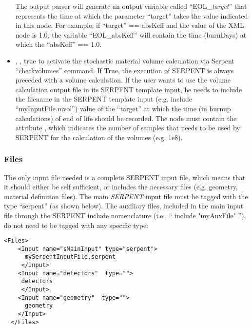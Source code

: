 \begin{itemize}
                                                              \nb  The output parser will generate an output variable called ``EOL\_\textit{target}'' that represents the time at which the 
                                                              parameter ``target'' takes the value indicated in this node. For example,  if ``target'' == absKeff and the value of the XML node is 1.0, 
                                                              the variable ``EOL\_absKeff'' will contain the time (burnDays) at which the ``absKeff'' == 1.0.
   \item {}, ,  true to activate the stochastic material volume calculation via Serpent ``checkvolumes'' command. If True, the execution of 
                                                             SERPENT is always preceded with a volume calculation. If the user wants to use the volume calculation output file in its SERPENT template input, he needs to include 
                                                             the filename in the SERPENT template input (e.g. include ``myInputFile.mvol'')  value of the ``target'' at which the time (in burnup calculations) of end of life should be recorded.
                                                             The   node  must contain the attribute , which indicates the number of samples that needs to be used by SERPENT for the calculation of the volumes (e.g. 1e8).                                                         
\end{itemize}

\subsubsection{Files}
The only input file needed is a complete SERPENT input file,
which means that it should either be self sufficient, or includes
the necessary files (e.g. geometry, material definition files).
The main \textit{SERPENT} input file must be tagged with the
type ``serpent'' (as shown below). The auxiliary files, included in the
main input file through the SERPENT include nomenclature (i.e., `` include "myAuxFile" ''),
do not need to be tagged with any specific type:

\begin{lstlisting}[style=XML]
  <Files>
    <Input name="sMainInput" type="serpent">
      mySerpentInputFile.serpent
     </Input>
    <Input name="detectors"  type="">
     detectors
     </Input>
    <Input name="geometry"  type="">
      geometry
    </Input>
  </Files>
\end{lstlisting}

